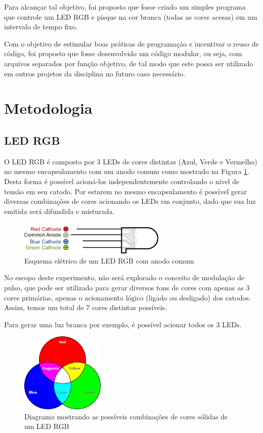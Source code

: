\documentclass{article}
\begin{document}
Para alcançar tal objetivo, foi proposto que fosse criado um simples programa que controle um LED RGB e pisque na cor branca (todas as cores acesas) em um intervalo de tempo fixo.

Com o objetivo de  estimular boas práticas de programação e incentivar o reuso de código, foi proposto que fosse desenvolvido um código modular, ou seja, com arquivos separados por função objetivo, de tal modo que este possa ser utilizado em outros projetos da disciplina no futuro caso necessário.

\section{Metodologia}
\subsection{LED RGB}
O LED RGB é composto por 3 LEDs de cores distintas (Azul, Verde e Vermelho) no mesmo encapsulamento com um anodo comum como mostrado na Figura \ref{led_rgb}. Desta forma é possível acioná-los independentemente controlando o nível de tensão em seu catodo.
Por estarem no mesmo encapsulamento é possível gerar diversas combinações de cores acionando os LEDs em conjunto, dado que sua luz emitida será difundida e misturada.

\begin{figure}[ht!]
\centering
\includegraphics[width=70mm]{rgb_led.png}
\caption{Esquema elétrico de um LED RGB com anodo comum \label{led_rgb}}
\end{figure}

No escopo deste experimento, não será explorado o conceito de modulação de pulso, que pode ser utilizado para gerar diversos tons de cores com apenas as 3 cores primárias, apenas o acionamento lógico (ligado ou desligado) dos catodos. Assim, temos um total de 7 cores distintas possíveis.

Para gerar uma luz branca por exemplo, é possível acionar todos os 3 LEDs.

\begin{figure}[ht!]
\centering
\includegraphics[width=40mm]{rgb_colors.png}
\caption{Diagrama mostrando as possíveis combinações de cores sólidas de um LED RGB \label{rgb_colors}}
\end{figure}
\end{document}
